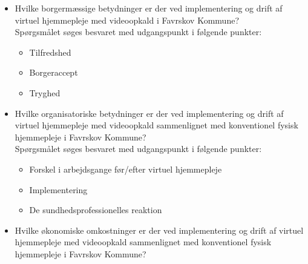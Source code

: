 \begin{itemize}
	\item Hvilke borgermæssige betydninger er der ved implementering og drift af virtuel hjemmepleje med videoopkald i Favrskov Kommune? \\Spørgsmålet søges besvaret med udgangspunkt i følgende punkter:
	\begin{itemize}
	\item Tilfredshed
	\item Borgeraccept
	\item Tryghed
\end{itemize}
\end{itemize}

\begin{itemize}
	\item Hvilke organisatoriske betydninger er der ved implementering og drift af virtuel hjemmepleje med videoopkald sammenlignet med konventionel fysisk hjemmepleje i Favrskov Kommune? \\Spørgsmålet søges besvaret med udgangspunkt i følgende punkter:
	\begin{itemize}
	\item Forskel i arbejdsgange før/efter virtuel hjemmepleje
	\item Implementering
	\item De sundhedsprofessionelles reaktion

\end{itemize}
\end{itemize}


\begin{itemize}
	\item Hvilke økonomiske omkostninger er der ved implementering og drift af virtuel hjemmepleje med videoopkald sammenlignet med konventionel fysisk hjemmepleje i Favrskov Kommune?
\end{itemize}

